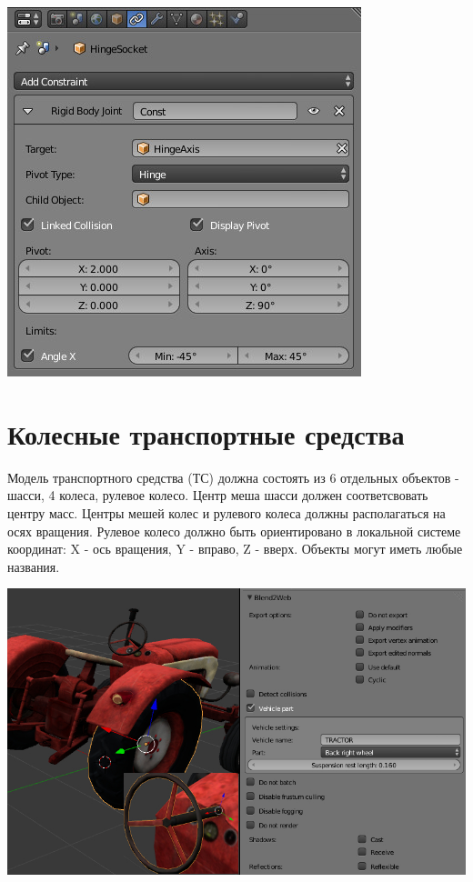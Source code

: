 \documentclass[a4paper,12pt,oneside]{sphinxmanual}
\begin{document}
\includegraphics[width=1.000\linewidth]{physics_constraints_panel.jpg}

\begin{DUlineblock}{0em}
\item[] 
\end{DUlineblock}


\section{Колесные транспортные средства}
\label{physics:id5}
Модель транспортного средства (ТС) должна состоять из 6 отдельных объектов - шасси, 4 колеса, рулевое колесо. Центр меша шасси должен соответсвовать центру масс. Центры мешей колес и рулевого колеса должны располагаться на осях вращения. Рулевое колесо должно быть ориентировано в локальной системе координат: X - ось вращения, Y - вправо, Z - вверх. Объекты могут иметь любые названия.

\includegraphics[width=1.000\linewidth]{physics_vehicle_wheeled.jpg}
\end{document}
